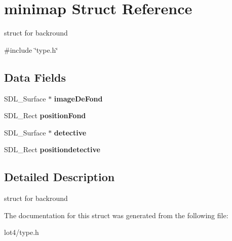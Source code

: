 \hypertarget{structminimap}{}\section{minimap Struct Reference}
\label{structminimap}


struct for backround  




{\ttfamily \#include \char`\"{}type.\+h\char`\"{}}

\subsection*{Data Fields}
\begin{DoxyCompactItemize}
\item 
S\+D\+L\+\_\+\+Surface $\ast$ {\bfseries image\+De\+Fond}\hypertarget{structminimap_a4209795915394333a274ce236431312e}{}\label{structminimap_a4209795915394333a274ce236431312e}

\item 
S\+D\+L\+\_\+\+Rect {\bfseries position\+Fond}\hypertarget{structminimap_a2f529aabfdb3b15e5991ea91ca48aaa6}{}\label{structminimap_a2f529aabfdb3b15e5991ea91ca48aaa6}

\item 
S\+D\+L\+\_\+\+Surface $\ast$ {\bfseries detective}\hypertarget{structminimap_a850de5a08feed651a4fa63ef64256708}{}\label{structminimap_a850de5a08feed651a4fa63ef64256708}

\item 
S\+D\+L\+\_\+\+Rect {\bfseries positiondetective}\hypertarget{structminimap_a9466c88ff7ccadf25b23590be92813be}{}\label{structminimap_a9466c88ff7ccadf25b23590be92813be}

\end{DoxyCompactItemize}


\subsection{Detailed Description}
struct for backround 

The documentation for this struct was generated from the following file\+:\begin{DoxyCompactItemize}
\item 
lot4/type.\+h\end{DoxyCompactItemize}
